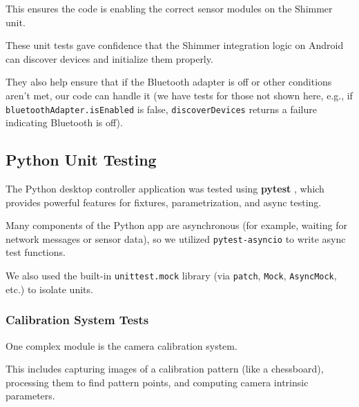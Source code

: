 {{This ensures the code is enabling the correct sensor modules on the Shimmer
unit.

These unit tests gave confidence that the Shimmer integration logic on Android
can discover devices and initialize them properly.

They also help ensure that if the Bluetooth adapter is off or other conditions
aren't met, our code can handle it (we have tests for those not shown here,
e.g., if \texttt{bluetoothAdapter.isEnabled} is false, \texttt{discoverDevices}
returns a failure indicating Bluetooth is off).

\subsection{Python Unit Testing}

The Python desktop controller application was tested using \textbf{pytest}
, which provides powerful features for fixtures, parametrization, and async
testing.

Many components of the Python app are asynchronous (for example, waiting for
network messages or sensor data), so we utilized \texttt{pytest-asyncio} to
write async test functions.

We also used the built-in \texttt{unittest.mock} library (via \texttt{patch},
\texttt{Mock}, \texttt{AsyncMock}, etc.) to isolate units.

\subsubsection{Calibration System Tests}

One complex module is the camera calibration system.

This includes capturing images of a calibration pattern (like a chessboard),
processing them to find pattern points, and computing camera intrinsic
parameters.

}}
